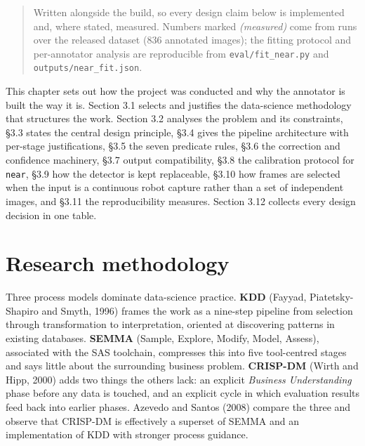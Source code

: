 
\begin{quote}
Written alongside the build, so every design claim below is implemented and, where stated, measured. Numbers marked \textit{(measured)} come from runs over the released dataset (836 annotated images); the fitting protocol and per-annotator analysis are reproducible from \texttt{eval/fit\_near.py} and \texttt{outputs/near\_fit.json}.
\end{quote}

This chapter sets out how the project was conducted and why the annotator is built the way it is. Section 3.1 selects and justifies the data-science methodology that structures the work. Section 3.2 analyses the problem and its constraints, \S3.3 states the central design principle, \S3.4 gives the pipeline architecture with per-stage justifications, \S3.5 the seven predicate rules, \S3.6 the correction and confidence machinery, \S3.7 output compatibility, \S3.8 the calibration protocol for \texttt{near}, \S3.9 how the detector is kept replaceable, \S3.10 how frames are selected when the input is a continuous robot capture rather than a set of independent images, and \S3.11 the reproducibility measures. Section 3.12 collects every design decision in one table.

\section{Research methodology}

Three process models dominate data-science practice. \textbf{KDD} (Fayyad, Piatetsky-Shapiro and Smyth, 1996) frames the work as a nine-step pipeline from selection through transformation to interpretation, oriented at discovering patterns in existing databases. \textbf{SEMMA} (Sample, Explore, Modify, Model, Assess), associated with the SAS toolchain, compresses this into five tool-centred stages and says little about the surrounding business problem. \textbf{CRISP-DM} (Wirth and Hipp, 2000) adds two things the others lack: an explicit \textit{Business Understanding} phase before any data is touched, and an explicit cycle in which evaluation results feed back into earlier phases. Azevedo and Santos (2008) compare the three and observe that CRISP-DM is effectively a superset of SEMMA and an implementation of KDD with stronger process guidance.

